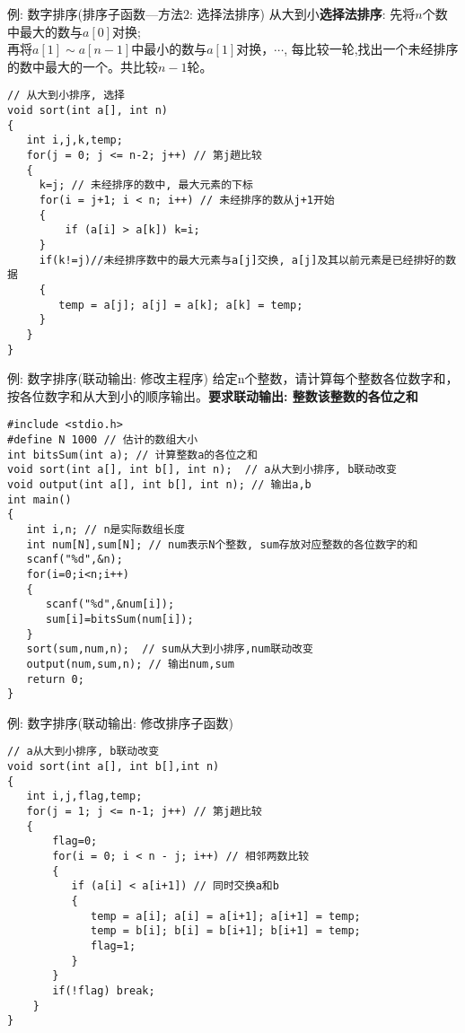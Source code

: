 \begin{frame}{例: 数字排序(排序子函数---方法2: 选择法排序)}
从大到小\textbf{选择法排序}: 先将$n$个数中最大的数与$a[0]$对换;\\
再将$a[1]\sim a[n-1]中最小的数与a[1]$对换，$\cdots$, 每比较一轮,找出一个未经排序的数中最大的一个。共比较$n-1$轮。
\begin{lstlisting}
// 从大到小排序, 选择
void sort(int a[], int n)
{
   int i,j,k,temp;
   for(j = 0; j <= n-2; j++) // 第j趟比较
   {
     k=j; // 未经排序的数中, 最大元素的下标
     for(i = j+1; i < n; i++) // 未经排序的数从j+1开始
     {
         if (a[i] > a[k]) k=i;
     }
     if(k!=j)//未经排序数中的最大元素与a[j]交换, a[j]及其以前元素是已经排好的数据
     { 
        temp = a[j]; a[j] = a[k]; a[k] = temp; 
     }
   }
}
\end{lstlisting}
\end{frame}

\begin{frame}{例: 数字排序(联动输出: 修改主程序)}
给定n个整数，请计算每个整数各位数字和，按各位数字和从大到小的顺序输出。\textbf{要求联动输出: 整数\quad 该整数的各位之和}
\begin{lstlisting}
#include <stdio.h>
#define N 1000 // 估计的数组大小
int bitsSum(int a); // 计算整数a的各位之和
void sort(int a[], int b[], int n);  // a从大到小排序, b联动改变
void output(int a[], int b[], int n); // 输出a,b
int main()
{
   int i,n; // n是实际数组长度 
   int num[N],sum[N]; // num表示N个整数, sum存放对应整数的各位数字的和  
   scanf("%d",&n);
   for(i=0;i<n;i++) 
   {
      scanf("%d",&num[i]); 
      sum[i]=bitsSum(num[i]);
   }
   sort(sum,num,n);  // sum从大到小排序,num联动改变
   output(num,sum,n); // 输出num,sum
   return 0;
}
\end{lstlisting}
\end{frame}

\begin{frame}{例: 数字排序(联动输出: 修改排序子函数)}
\begin{lstlisting}
// a从大到小排序, b联动改变
void sort(int a[], int b[],int n)
{
   int i,j,flag,temp;
   for(j = 1; j <= n-1; j++) // 第j趟比较
   {
       flag=0;
       for(i = 0; i < n - j; i++) // 相邻两数比较
       {
          if (a[i] < a[i+1]) // 同时交换a和b
          { 
             temp = a[i]; a[i] = a[i+1]; a[i+1] = temp; 
             temp = b[i]; b[i] = b[i+1]; b[i+1] = temp; 
             flag=1;
          }
       }
       if(!flag) break;
    }
}
\end{lstlisting}
\end{frame}

